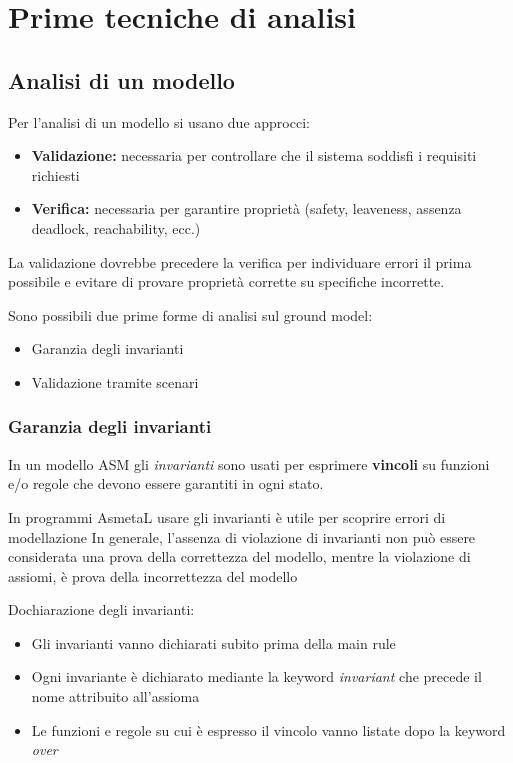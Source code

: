 \chapter{Prime tecniche di analisi}
\section{Analisi di un modello}
Per l'analisi di un modello si usano due approcci:
\begin{itemize}
    \item \textbf{Validazione:} necessaria per controllare che il
    sistema soddisfi i requisiti richiesti
    \item \textbf{Verifica:} necessaria per garantire proprietà
    (safety, leaveness, assenza deadlock,
    reachability, ecc.)
\end{itemize}
La validazione dovrebbe precedere la verifica per individuare errori il prima possibile
e evitare di provare proprietà corrette su specifiche incorrette.

\noindent Sono possibili due prime forme di analisi
sul ground model:
\begin{itemize}
    \item Garanzia degli invarianti
    \item Validazione tramite scenari
\end{itemize}

\subsection{Garanzia degli invarianti}
In un modello ASM gli \textit{invarianti} sono usati per esprimere \textbf{vincoli} su funzioni e/o regole
che devono essere garantiti in ogni stato. 

\noindent In programmi AsmetaL usare gli invarianti è utile per scoprire errori di modellazione
In generale, l'assenza di violazione di invarianti non può essere considerata una prova della correttezza del modello, mentre la violazione di
assiomi, è prova della incorrettezza del modello

\noindent Dochiarazione degli invarianti:
\begin{itemize}
    \item Gli invarianti vanno dichiarati subito prima della main rule
    \item Ogni invariante è dichiarato mediante la keyword \textit{invariant} che precede il nome attribuito all'assioma
    \item Le funzioni e regole su cui è espresso il vincolo vanno listate dopo la keyword \textit{over}
\end{itemize}

